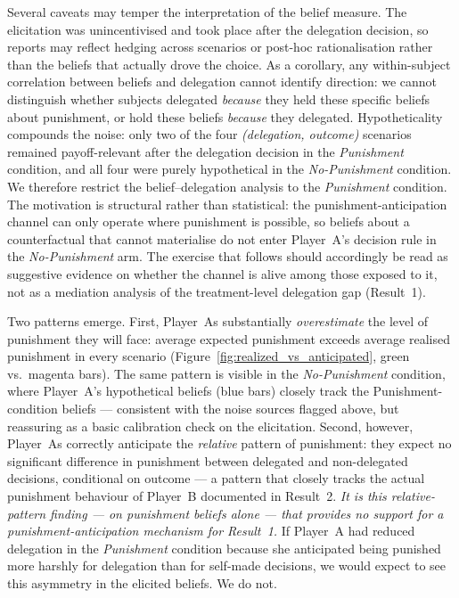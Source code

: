 Several caveats may temper the interpretation of the belief measure. The elicitation was unincentivised and took place after the delegation decision, so reports may reflect hedging across scenarios or post-hoc rationalisation rather than the beliefs that actually drove the choice. As a corollary, any within-subject correlation between beliefs and delegation cannot identify direction: we cannot distinguish whether subjects delegated \textit{because} they held these specific beliefs about punishment, or hold these beliefs \textit{because} they delegated. Hypotheticality compounds the noise: only two of the four \textit{(delegation, outcome)} scenarios remained payoff-relevant after the delegation decision in the \textit{Punishment} condition, and all four were purely hypothetical in the \textit{No-Punishment} condition. We therefore restrict the belief--delegation analysis to the \textit{Punishment} condition. The motivation is structural rather than statistical: the punishment-anticipation channel can only operate where punishment is possible, so beliefs about a counterfactual that cannot materialise do not enter Player~A's decision rule in the \textit{No-Punishment} arm. The exercise that follows should accordingly be read as suggestive evidence on whether the channel is alive among those exposed to it, not as a mediation analysis of the treatment-level delegation gap (Result~1).

Two patterns emerge. First, Player~As substantially \textit{overestimate} the level of punishment they will face: average expected punishment exceeds average realised punishment in every scenario (Figure~\ref{fig:realized_vs_anticipated}, green vs.\ magenta bars). The same pattern is visible in the \textit{No-Punishment} condition, where Player~A's hypothetical beliefs (blue bars) closely track the Punishment-condition beliefs --- consistent with the noise sources flagged above, but reassuring as a basic calibration check on the elicitation. Second, however, Player~As correctly anticipate the \textit{relative} pattern of punishment: they expect no significant difference in punishment between delegated and non-delegated decisions, conditional on outcome --- a pattern that closely tracks the actual punishment behaviour of Player~B documented in Result~2. \textit{It is this relative-pattern finding --- on punishment beliefs alone --- that provides no support for a punishment-anticipation mechanism for Result~1.} If Player~A had reduced delegation in the \textit{Punishment} condition because she anticipated being punished more harshly for delegation than for self-made decisions, we would expect to see this asymmetry in the elicited beliefs. We do not.

